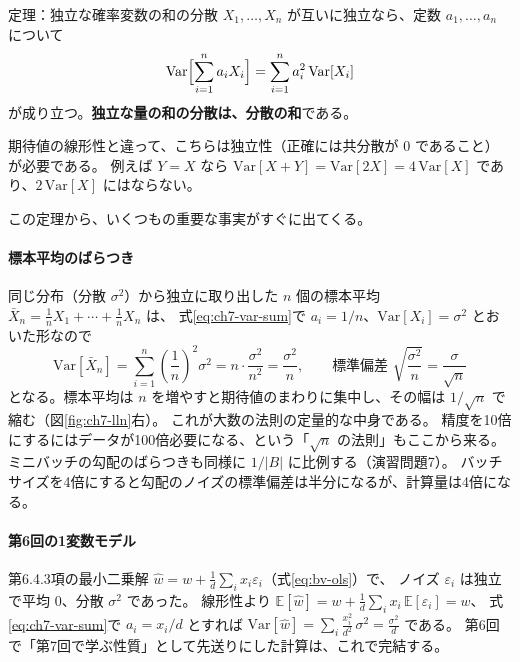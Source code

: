 \begin{itembox}[l]{定理：独立な確率変数の和の分散}
$X_1, \ldots, X_n$ が互いに独立なら、定数 $a_1, \ldots, a_n$ について
\begin{equation}
  \mathrm{Var}\Bigl[ \sum_{i=1}^n a_i X_i \Bigr] = \sum_{i=1}^n a_i^2\,\mathrm{Var}[X_i]
  \label{eq:ch7-var-sum}
\end{equation}
が成り立つ。\textbf{独立な量の和の分散は、分散の和}である。
\end{itembox}

期待値の線形性と違って、こちらは独立性（正確には共分散が $0$ であること）が必要である。
例えば $Y = X$ なら $\mathrm{Var}[X + Y] = \mathrm{Var}[2X] = 4\,\mathrm{Var}[X]$ であり、$2\,\mathrm{Var}[X]$ にはならない。

この定理から、いくつもの重要な事実がすぐに出てくる。

\paragraph{標本平均のばらつき}
同じ分布（分散 $\sigma^2$）から独立に取り出した $n$ 個の標本平均 $\bar{X}_n = \frac{1}{n}X_1 + \cdots + \frac{1}{n}X_n$ は、
式\eqref{eq:ch7-var-sum}で $a_i = 1/n$、$\mathrm{Var}[X_i] = \sigma^2$ とおいた形なので
\begin{equation}
  \mathrm{Var}[\bar{X}_n] = \sum_{i=1}^n \left(\frac{1}{n}\right)^2 \sigma^2 = n \cdot \frac{\sigma^2}{n^2} = \frac{\sigma^2}{n}, \qquad
  \text{標準偏差 } \sqrt{\frac{\sigma^2}{n}} = \frac{\sigma}{\sqrt{n}}
  \label{eq:ch7-var-mean}
\end{equation}
となる。標本平均は $n$ を増やすと期待値のまわりに集中し、その幅は $1/\sqrt{n}$ で縮む（図\ref{fig:ch7-lln}右）。
これが大数の法則の定量的な中身である。
精度を10倍にするにはデータが100倍必要になる、という「$\sqrt{n}$ の法則」もここから来る。
ミニバッチの勾配のばらつきも同様に $1/|B|$ に比例する（演習問題7）。
バッチサイズを4倍にすると勾配のノイズの標準偏差は半分になるが、計算量は4倍になる。

\paragraph{第6回の1変数モデル}
第6.4.3項の最小二乗解 $\hat{w} = w + \frac{1}{d}\sum_i x_i\varepsilon_i$（式\eqref{eq:bv-ols}）で、
ノイズ $\varepsilon_i$ は独立で平均 $0$、分散 $\sigma^2$ であった。
線形性より $\mathbb{E}[\hat{w}] = w + \frac{1}{d}\sum_i x_i\,\mathbb{E}[\varepsilon_i] = w$、
式\eqref{eq:ch7-var-sum}で $a_i = x_i/d$ とすれば
$\mathrm{Var}[\hat{w}] = \sum_i \frac{x_i^2}{d^2}\,\sigma^2 = \frac{\sigma^2}{d}$ である。
第6回で「第7回で学ぶ性質」として先送りにした計算は、これで完結する。


